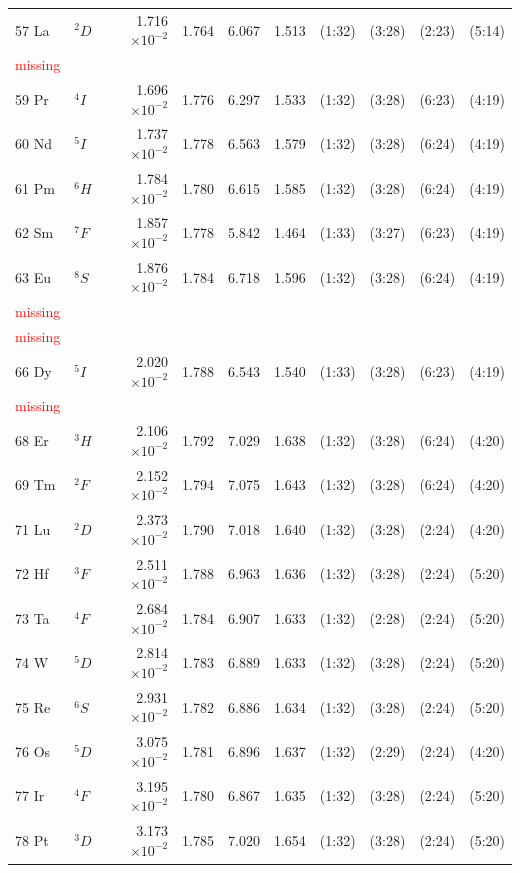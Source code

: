 \documentclass[12pt]{report}
\newcommand{\notetodylan}[1]{\textcolor{red}{#1}} %
\begin{document}
\begin{longtable}{l l r r r r r r r r}
57 La & $^{2}D$ & 1.716$\times10^{-2}$ & 1.764 & 6.067 & 1.513 & (1:32) & (3:28) & (2:23) & (5:14) \\
\notetodylan{missing}	\\
59 Pr & $^{4}I$ & 1.696$\times10^{-2}$ & 1.776 & 6.297 & 1.533 & (1:32) & (3:28) & (6:23) & (4:19) \\
60 Nd & $^{5}I$ & 1.737$\times10^{-2}$ & 1.778 & 6.563 & 1.579 & (1:32) & (3:28) & (6:24) & (4:19) \\
61 Pm & $^{6}H$ & 1.784$\times10^{-2}$ & 1.780 & 6.615 & 1.585 & (1:32) & (3:28) & (6:24) & (4:19) \\
62 Sm & $^{7}F$ & 1.857$\times10^{-2}$ & 1.778 & 5.842 & 1.464 & (1:33) & (3:27) & (6:23) & (4:19) \\
63 Eu & $^{8}S$ & 1.876$\times10^{-2}$ & 1.784 & 6.718 & 1.596 & (1:32) & (3:28) & (6:24) & (4:19) \\
\notetodylan{missing}	\\
\notetodylan{missing}	\\
66 Dy & $^{5}I$ & 2.020$\times10^{-2}$ & 1.788 & 6.543 & 1.540 & (1:33) & (3:28) & (6:23) & (4:19) \\
\notetodylan{missing}	\\
68 Er & $^{3}H$ & 2.106$\times10^{-2}$ & 1.792 & 7.029 & 1.638 & (1:32) & (3:28) & (6:24) & (4:20) \\
69 Tm & $^{2}F$ & 2.152$\times10^{-2}$ & 1.794 & 7.075 & 1.643 & (1:32) & (3:28) & (6:24) & (4:20) \\
71 Lu & $^{2}D$ & 2.373$\times10^{-2}$ & 1.790 & 7.018 & 1.640 & (1:32) & (3:28) & (2:24) & (4:20) \\
72 Hf & $^{3}F$ & 2.511$\times10^{-2}$ & 1.788 & 6.963 & 1.636 & (1:32) & (3:28) & (2:24) & (5:20) \\
73 Ta & $^{4}F$ & 2.684$\times10^{-2}$ & 1.784 & 6.907 & 1.633 & (1:32) & (2:28) & (2:24) & (5:20) \\
74 W & $^{5}D$ & 2.814$\times10^{-2}$ & 1.783 & 6.889 & 1.633 & (1:32) & (3:28) & (2:24) & (5:20) \\
75 Re & $^{6}S$ & 2.931$\times10^{-2}$ & 1.782 & 6.886 & 1.634 & (1:32) & (3:28) & (2:24) & (5:20) \\
76 Os & $^{5}D$ & 3.075$\times10^{-2}$ & 1.781 & 6.896 & 1.637 & (1:32) & (2:29) & (2:24) & (4:20) \\
77 Ir & $^{4}F$ & 3.195$\times10^{-2}$ & 1.780 & 6.867 & 1.635 & (1:32) & (3:28) & (2:24) & (5:20) \\
78 Pt & $^{3}D$ & 3.173$\times10^{-2}$ & 1.785 & 7.020 & 1.654 & (1:32) & (3:28) & (2:24) & (5:20) \\

\end{longtable}
\end{document}
